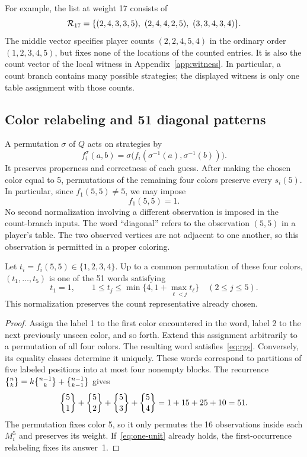For example, the list at weight 17 consists of
\[
\calR_{17}=\{(2,4,3,3,5),\ (2,4,4,2,5),\ (3,3,4,3,4)\}.
\]
The middle vector specifies player counts $(2,2,4,5,4)$ in the ordinary
order $(1,2,3,4,5)$, but fixes none of the locations of the counted entries.
It is also the count vector of the local witness in Appendix~\ref{app:witness}.
In particular, a count branch contains many possible strategies; the
displayed witness is only one table assignment with those counts.

\subsection{Color relabeling and 51 diagonal patterns}
A permutation $\sigma$ of $Q$ acts on strategies by
\begin{equation}\label{eq:color-action}
f_i^\sigma(a,b)=
\sigma\bigl(f_i(\sigma^{-1}(a),\sigma^{-1}(b))\bigr).
\end{equation}
It preserves properness and correctness of each guess. After making the
chosen color equal to 5, permutations of the remaining four colors preserve
every $s_i(5)$. In particular, since $f_1(5,5)\ne5$, we may impose
\begin{equation}\label{eq:one-unit}
f_1(5,5)=1.
\end{equation}
No second normalization involving a different observation is imposed in
the count-branch inputs.
The word ``diagonal'' refers to the observation $(5,5)$ in a player's
table. The two observed vertices are not adjacent to one another, so this
observation is permitted in a proper coloring.

\begin{lemma}\label{lem:patterns}
Let $t_i=f_i(5,5)\in\{1,2,3,4\}$. Up to a common permutation of these
four colors, $(t_1,\ldots,t_5)$ is one of the 51 words satisfying
\begin{equation}\label{eq:rgs}
t_1=1,\qquad
1\leq t_j\leq\min\{4,1+\max_{\ell<j}t_\ell\}\quad(2\leq j\leq5).
\end{equation}
This normalization preserves the count representative already chosen.
\end{lemma}
\begin{proof}
Assign the label 1 to the first color encountered in the word, label 2 to
the next previously unseen color, and so forth. Extend this assignment
arbitrarily to a permutation of all four colors. The resulting word
satisfies~\eqref{eq:rgs}. Conversely, its equality classes determine it
uniquely. These words correspond to partitions of five labeled positions
into at most four nonempty blocks. The recurrence
$\Stirling{n}{k}=k\Stirling{n-1}{k}+\Stirling{n-1}{k-1}$ gives
\[
\Stirling{5}{1}+\Stirling{5}{2}+\Stirling{5}{3}+\Stirling{5}{4}
=1+15+25+10=51.
\]
The permutation fixes color 5, so it only permutes the 16 observations
inside each $M_i^5$ and preserves its weight. If~\eqref{eq:one-unit}
already holds, the first-occurrence relabeling fixes its answer~1.
\end{proof}

